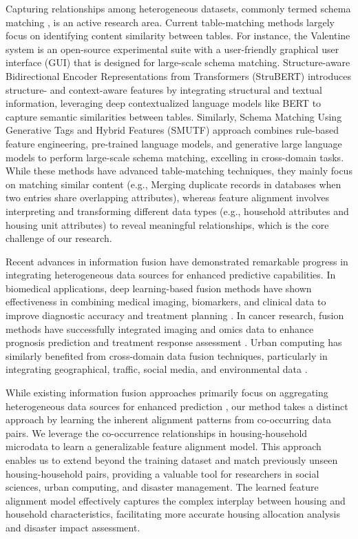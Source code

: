 Capturing relationships among heterogeneous datasets, commonly termed schema matching \cite{nachouki2008multi, johnston2008web}, is an active research area. Current table-matching methods largely focus on identifying content similarity between tables. For instance, the Valentine system \cite{koutras2021valentine} is an open-source experimental suite with a user-friendly graphical user interface (GUI) that is designed for large-scale schema matching. Structure-aware Bidirectional Encoder Representations from Transformers (StruBERT) \cite{trabelsi2022strubert} introduces structure- and context-aware features by integrating structural and textual information, leveraging deep contextualized language models like BERT to capture semantic similarities between tables. Similarly, Schema Matching Using Generative Tags and Hybrid Features (SMUTF) \cite{zhang2024smutf} approach combines rule-based feature engineering, pre-trained language models, and generative large language models to perform large-scale schema matching, excelling in cross-domain tasks. While these methods have advanced table-matching techniques, they mainly focus on matching similar content (e.g., Merging duplicate records in databases when two entries share overlapping attributes), whereas feature alignment involves interpreting and transforming different data types (e.g., household attributes and housing unit attributes) to reveal meaningful relationships, which is the core challenge of our research.

Recent advances in information fusion have demonstrated remarkable progress in integrating heterogeneous data sources for enhanced predictive capabilities. In biomedical applications, deep learning-based fusion methods have shown effectiveness in combining medical imaging, biomarkers, and clinical data to improve diagnostic accuracy and treatment planning \cite{zitnik2019machine, duan2024deep, zhao2024review}. In cancer research, fusion methods have successfully integrated imaging and omics data to enhance prognosis prediction and treatment response assessment \cite{lu2024privacy}.
Urban computing has similarly benefited from cross-domain data fusion techniques, particularly in integrating geographical, traffic, social media, and environmental data \cite{zou2025deep}.

While existing information fusion approaches primarily focus on aggregating heterogeneous data sources for enhanced prediction \cite{mai2023learning}, our method takes a distinct approach by learning the inherent alignment patterns from co-occurring data pairs. We leverage the co-occurrence relationships in housing-household microdata to learn a generalizable feature alignment model. This approach enables us to extend beyond the training dataset and match previously unseen housing-household pairs, providing a valuable tool for researchers in social sciences, urban computing, and disaster management. The learned feature alignment model effectively captures the complex interplay between housing and household characteristics, facilitating more accurate housing allocation analysis and disaster impact assessment.

